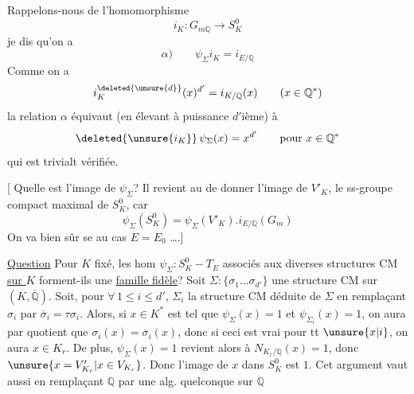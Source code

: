 Rappelons-nous de l'homomorphisme
\[
i_K:G_{m\mathbb Q}\longrightarrow S_K^0
\]
je dis qu'on a
\[
\alpha)\qquad\boxed{\psi_\Sigma i_K=i_{E/\mathbb Q}}
\]
Comme on a
\[
i_K^{\deleted{\unsure{d}}}(x)^{d'}=i_{K/\mathbb Q}(x)\qquad(x\in\mathbb Q^*)
\]
la relation $\alpha$ équivaut (en élevant à puissance $d'$ième) à
\[
\deleted{\unsure{i_K}}\,\psi_\Sigma(x)=x^{d'}\qquad\text{pour }x\in\mathbb Q^*
\]
qui est trivialt vérifiée.

[ Quelle est l'image de $\psi_\Sigma$? Il revient au  de
donner l'image de $V'_K$, le ss-groupe compact maximal de $S_K^0$, car
\[
\psi_\Sigma(S_K^0)=\psi_\Sigma(V'_K).i_{E/\mathbb Q}(G_m)
\]
On va bien sûr se   au cas
$E=E_0$ \ldots.]

\uline{Question} Pour $K$ fixé,  les hom $\psi_\Sigma:S_K^0-T_E$ associés aux diverses
structures CM \uline{sur $K$}  forment-ils une \uline{famille fidèle}?
Soit $\Sigma:\{\sigma_1\ldots\sigma_{d'}\}$ une structure CM sur $(K,\overline{\mathbb Q})$.
 Soit, pour $\forall\,1\leq i\leq d'$,
$\Sigma_i$  la structure CM déduite de $\Sigma$ en remplaçant
$\sigma_i$ par $\overline\sigma_i=\tau\sigma_i$. Alors, si $x\in K^*$ est tel que
$\psi_\Sigma(x)=1$ et $\psi_{\Sigma_i}(x)=1$, on aura par quotient que
$\sigma_i(x)=\overline\sigma_i(x)$, donc si ceci est vrai pour tt $\unsure{x|i}$,
on aura $x\in K_r$. De plus,  $\psi_\Sigma(x)=1$ revient alors à
$N_{K_r/\mathbb Q}(x)=1$, donc $\unsure{x=V'_{K_r}|x\in V_{K_r}}$.
Donc l'image de $x$ dans $S_K^0$ est $1$.
Cet argument vaut aussi en remplaçant $\mathbb Q$ par une alg. quelconque sur $\mathbb Q$
\deleted{[car $\unsure{\bigcap\operatorname{Ker}(\sigma_i,\overline\sigma_i)}=K_r$ est
\unsure{stable} par}
